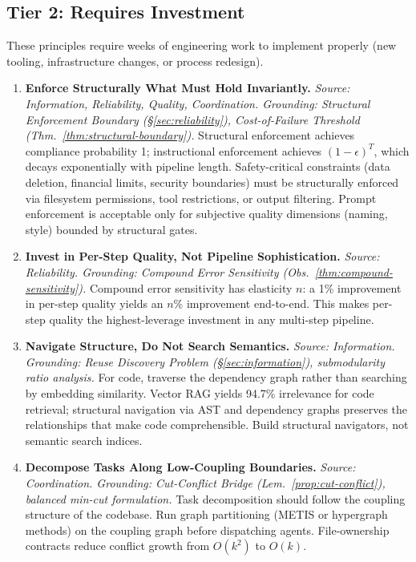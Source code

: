 \documentclass[11pt, a4paper]{googledeepmind}
\begin{document}
\subsection{Tier 2: Requires Investment}
\label{sec:tier2}

These principles require weeks of engineering work to implement properly (new tooling, infrastructure changes, or process redesign).

\begin{enumerate}[label=\textbf{P\arabic*.}, leftmargin=3em, resume]

\item \textbf{Enforce Structurally What Must Hold Invariantly.}
\emph{Source: Information, Reliability, Quality, Coordination. Grounding: Structural Enforcement Boundary (\S\ref{sec:reliability}), Cost-of-Failure Threshold (Thm.~\ref{thm:structural-boundary}).}
Structural enforcement achieves compliance probability 1; instructional enforcement achieves $(1-\epsilon)^T$, which decays exponentially with pipeline length. Safety-critical constraints (data deletion, financial limits, security boundaries) must be structurally enforced via filesystem permissions, tool restrictions, or output filtering. Prompt enforcement is acceptable only for subjective quality dimensions (naming, style) bounded by structural gates.

\item \textbf{Invest in Per-Step Quality, Not Pipeline Sophistication.}
\emph{Source: Reliability. Grounding: Compound Error Sensitivity (Obs.~\ref{thm:compound-sensitivity}).}
Compound error sensitivity has elasticity $n$: a 1\% improvement in per-step quality yields an $n$\% improvement end-to-end. This makes per-step quality the highest-leverage investment in any multi-step pipeline.

\item \textbf{Navigate Structure, Do Not Search Semantics.}
\emph{Source: Information. Grounding: Reuse Discovery Problem (\S\ref{sec:information}), submodularity ratio analysis.}
For code, traverse the dependency graph rather than searching by embedding similarity. Vector RAG yields 94.7\% irrelevance for code retrieval; structural navigation via AST and dependency graphs preserves the relationships that make code comprehensible. Build structural navigators, not semantic search indices.

\item \textbf{Decompose Tasks Along Low-Coupling Boundaries.}
\emph{Source: Coordination. Grounding: Cut-Conflict Bridge (Lem.~\ref{prop:cut-conflict}), balanced min-cut formulation.}
Task decomposition should follow the coupling structure of the codebase. Run graph partitioning (METIS or hypergraph methods) on the coupling graph before dispatching agents. File-ownership contracts reduce conflict growth from $O(k^2)$ to $O(k)$.


\end{enumerate}
\end{document}
